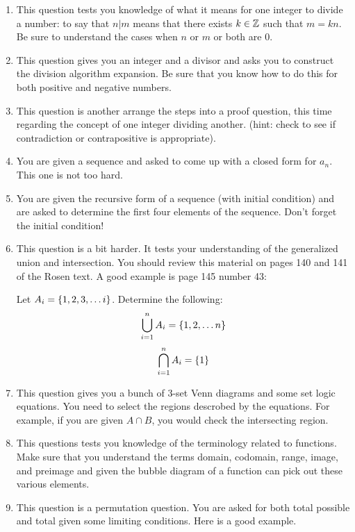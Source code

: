 \documentclass[letterpaper,12pt,fleqn]{article}
\begin{document}
\begin{enumerate}[left=0in]
\item This question tests you knowledge of what it means for one integer to divide a number: to say that
  \(n|m\) means that there exists \(k\in\mathbb{Z}\) such that \(m=kn\).  Be sure to understand the cases when \(n\) or
  \(m\) or both are 0.

\item This question gives you an integer and a divisor and asks you to construct the division algorithm
  expansion.  Be sure that you know how to do this for both positive and negative numbers.

\item This question is another arrange the steps into a proof question, this time regarding the concept of one
  integer dividing another.  (hint: check to see if contradiction or contrapositive is appropriate).

\item You are given a sequence and asked to come up with a closed form for \(a_n\).  This one is not too hard.

\item You are given the recursive form of a sequence (with initial condition) and are asked to determine the
  first four elements of the sequence.  Don't forget the initial condition!

\item This question is a bit harder.  It tests your understanding of the generalized union and intersection.
  You should review this material on pages 140 and 141 of the Rosen text.  A good example is page 145 number 43:

  Let \(A_i=\{1,2,3,\ldots i\}\).  Determine the following:
  \[\bigcup_{i=1}^nA_i=\{1,2,\ldots n\}\]
  \[\bigcap_{i=1}^nA_i=\{1\}\]

\item This question gives you a bunch of 3-set Venn diagrams and some set logic equations.  You need to select
  the regions descrobed by the equations.  For example, if you are given \(A\cap B\), you would check the
  intersecting region.

\item This questions tests you knowledge of the terminology related to functions.  Make sure that you
  understand the terms domain, codomain, range, image, and preimage and given the bubble diagram of a function
  can pick out these various elements.

\item This question is a permutation question.  You are asked for both total possible and total given some
  limiting conditions.  Here is a good example.


\end{enumerate}
\end{document}
